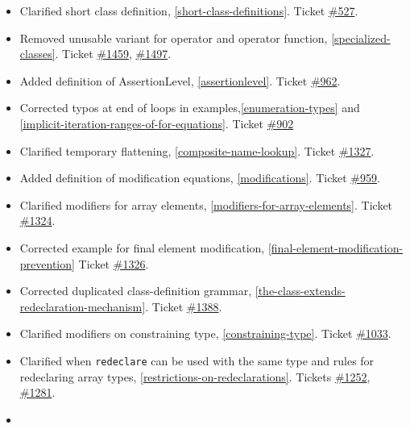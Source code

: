 \begin{itemize}
\item
  Clarified short class definition, \cref{short-class-definitions}. Ticket
  \href{https://github.com/modelica/ModelicaSpecification/issues/527}{\#527}.
\item
  Removed unusable variant for operator and operator function, \cref{specialized-classes}. Ticket
  \href{https://github.com/modelica/ModelicaSpecification/issues/1459}{\#1459},
  \href{https://github.com/modelica/ModelicaSpecification/issues/1497}{\#1497}.
\item
  Added definition of AssertionLevel, \cref{assertionlevel}. Ticket
  \href{https://github.com/modelica/ModelicaSpecification/issues/962}{\#962}.
\item
  Corrected typos at end of loops in examples,\cref{enumeration-types} and
  \cref{implicit-iteration-ranges-of-for-equations}. Ticket
  \href{https://github.com/modelica/ModelicaSpecification/issues/902}{\#902}
\item
  Clarified temporary flattening, \cref{composite-name-lookup}. Ticket
  \href{https://github.com/modelica/ModelicaSpecification/issues/1327}{\#1327}.
\item
  Added definition of modification equations, \cref{modifications}. Ticket
  \href{https://github.com/modelica/ModelicaSpecification/issues/959}{\#959}.
\item
  Clarified modifiers for array elements, \cref{modifiers-for-array-elements}. Ticket
  \href{https://github.com/modelica/ModelicaSpecification/issues/1324}{\#1324}.
\item
  Corrected example for final element modification, \cref{final-element-modification-prevention}
  Ticket \href{https://github.com/modelica/ModelicaSpecification/issues/1326}{\#1326}.
\item
  Corrected duplicated class-definition grammar, \cref{the-class-extends-redeclaration-mechanism}. Ticket
  \href{https://github.com/modelica/ModelicaSpecification/issues/1388}{\#1388}.
\item
  Clarified modifiers on constraining type, \cref{constraining-type}. Ticket
  \href{https://github.com/modelica/ModelicaSpecification/issues/1033}{\#1033}.
\item
  Clarified when \lstinline!redeclare! can be used with the same type and rules for redeclaring array types, \cref{restrictions-on-redeclarations}.
  Tickets
  \href{https://github.com/modelica/ModelicaSpecification/issues/1252}{\#1252},
  \href{https://github.com/modelica/ModelicaSpecification/issues/1281}{\#1281}.
\item

\end{itemize}
